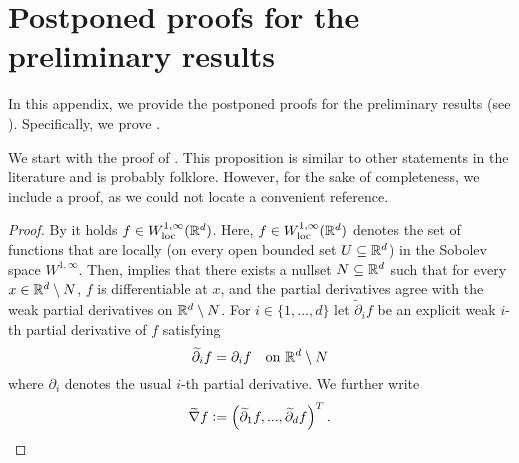 \section{Postponed proofs for the preliminary results} \label{sec:prelim_proofs}
In this appendix, we provide the postponed proofs for the preliminary results (see ). Specifically, we prove . 

We start with the proof of . This proposition is similar to other statements in the literature and is probably folklore. However, for the sake of completeness, we include a proof, as we could not locate a convenient reference.
\renewcommand*{\proofname}{Proof of \Cref{prop:lipgrad}}
\begin{proof}
By \cite[Section~4.2.3]{evans_measure_1992} it holds $f \in W^{1, \infty}_{\text{loc}}(\mathbb{R}^d)$. Here, $f \in W^{1, \infty}_{\text{loc}}(\mathbb{R}^d)$ denotes the set of functions that are locally (on every open bounded set $U \subseteq \mathbb{R}^d$) in the Sobolev space $W^{1, \infty}$. Then, \cite[Theorem~1~in~Section~6.2]{evans_measure_1992} implies that there exists a nullset $N \subseteq \mathbb{R}^d$ such that for every $x \in \mathbb{R}^d \setminus N$, $f$ is differentiable at $x$, and the partial derivatives agree with the weak partial derivatives on $\mathbb{R}^d \setminus N$. For $i \in \{1,...,d\}$ let $\widetilde{\partial}_i f$ be an explicit weak $i$-th partial derivative of $f$ satisfying 
\begin{equation*}
\widetilde{\partial}_i f = \partial_i f \quad \text{on }\mathbb{R}^d \setminus N
\end{equation*}
where $\partial_i$ denotes the usual $i$-th partial derivative. We further write
\begin{equation*}
\widetilde{\nabla} f \mathrel{\mathop:}= \left(\widetilde{\partial}_1 f, ..., \widetilde{\partial}_d f\right)^T.
\end{equation*}


\end{proof}
